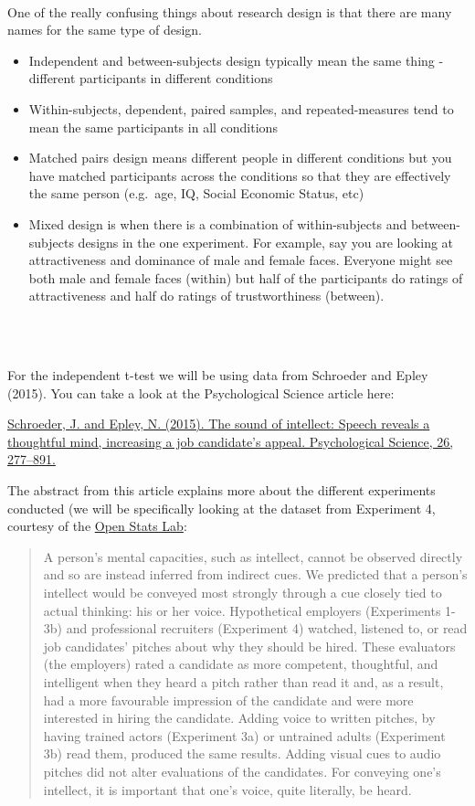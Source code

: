 \documentclass[]{book}
\providecommand{\tightlist}{%
  \setlength{\itemsep}{0pt}\setlength{\parskip}{0pt}}
\newenvironment{try}
    {
    \hline\\
    }
    { 
    \\\\\hline
    }
\begin{document}
\begin{try}
One of the really confusing things about research design is that there
are many names for the same type of design.

\begin{itemize}
\tightlist
\item
  Independent and between-subjects design typically mean the same thing
  - different participants in different conditions
\item
  Within-subjects, dependent, paired samples, and repeated-measures tend
  to mean the same participants in all conditions
\item
  Matched pairs design means different people in different conditions
  but you have matched participants across the conditions so that they
  are effectively the same person (e.g.~age, IQ, Social Economic Status,
  etc)
\item
  Mixed design is when there is a combination of within-subjects and
  between-subjects designs in the one experiment. For example, say you
  are looking at attractiveness and dominance of male and female faces.
  Everyone might see both male and female faces (within) but half of the
  participants do ratings of attractiveness and half do ratings of
  trustworthiness (between).
\end{itemize}
\end{try}

For the independent t-test we will be using data from Schroeder and Epley (2015). You can take a look at the Psychological Science article here:

\href{https://doi.org/10.1177/0956797615572906}{Schroeder, J. and Epley, N. (2015). The sound of intellect: Speech reveals a thoughtful mind, increasing a job candidate's appeal. Psychological Science, 26, 277--891.}

The abstract from this article explains more about the different experiments conducted (we will be specifically looking at the dataset from Experiment 4, courtesy of the \href{https://sites.trinity.edu/osl/data-sets-and-activities/t-test-activities}{Open Stats Lab}:

\begin{quote}
A person's mental capacities, such as intellect, cannot be observed directly and so are instead inferred from indirect cues. We predicted that a person's intellect would be conveyed most strongly through a cue closely tied to actual thinking: his or her voice. Hypothetical employers (Experiments 1-3b) and professional recruiters (Experiment 4) watched, listened to, or read job candidates' pitches about why they should be hired. These evaluators (the employers) rated a candidate as more competent, thoughtful, and intelligent when they heard a pitch rather than read it and, as a result, had a more favourable impression of the candidate and were more interested in hiring the candidate. Adding voice to written pitches, by having trained actors (Experiment 3a) or untrained adults (Experiment 3b) read them, produced the same results. Adding visual cues to audio pitches did not alter evaluations of the candidates. For conveying one's intellect, it is important that one's voice, quite literally, be heard.
\end{quote}
\end{document}
